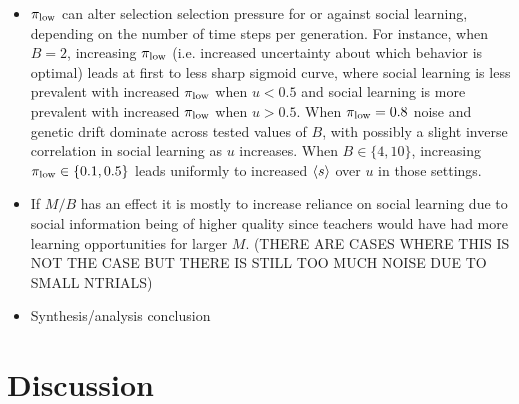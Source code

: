 \documentclass[letterpaper,11.5pt]{scrartcl}
\begin{document}
\begin{itemize}
  \item 
    $\pi_{\mathrm{low}}$ can alter selection selection pressure for or
    against social learning, depending on the number of time steps per generation.
    For instance, when $B=2$, increasing $\pi_{\mathrm{low}}$ (i.e. increased uncertainty
    about which behavior is optimal) leads at first to less sharp sigmoid curve, 
    where social learning is less prevalent with increased $\pi_{\mathrm{low}}$ when
    $u < 0.5$ and social learning is more prevalent with increased $\pi_{\mathrm{low}}$
    when $u > 0.5$. When $\pi_{\mathrm{low}} = 0.8$ noise and genetic drift dominate across
    tested values of $B$, with possibly a slight inverse correlation 
    in social learning as $u$ increases. When $B \in \{4,10\}$, increasing
    $\pi_{\mathrm{low}} \in \{0.1, 0.5\}$ leads uniformly to increased $\langle s \rangle$ over 
    $u$ in those settings.     

  \item
    If $M/B$ has an effect it is mostly to 
    increase reliance on social learning due to social information being of 
    higher quality since teachers would have had more learning opportunities
    for larger $M$. (THERE ARE CASES WHERE THIS IS NOT THE CASE BUT THERE IS 
    STILL TOO MUCH NOISE DUE TO SMALL NTRIALS)

  \item
    Synthesis/analysis conclusion 
    
\end{itemize}






\section{Discussion}




\setlength{\bibleftmargin}{.125in}
\setlength{\bibindent}{-\bibleftmargin}


% 
\end{document}
